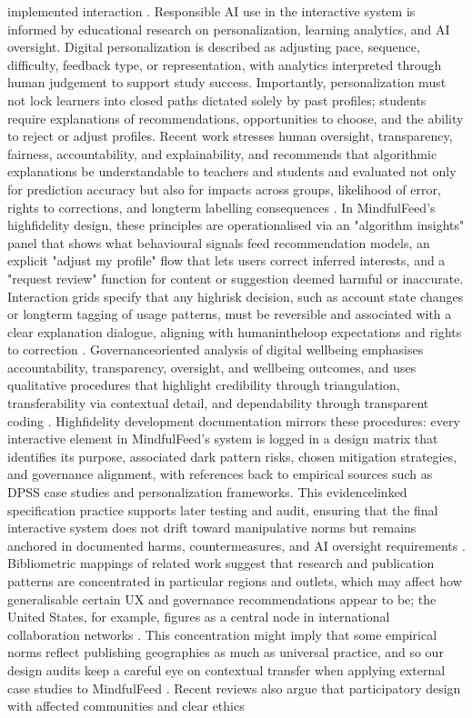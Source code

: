\documentclass{article}
\begin{document}
implemented interaction \parencites[6]{0270098}. Responsible AI use in the interactive system is informed by educational research on personalization, learning analytics, and AI oversight. Digital personalization is described as adjusting pace, sequence, difficulty, feedback type, or representation, with analytics interpreted through human judgement to support study success. Importantly, personalization must not lock learners into closed paths dictated solely by past profiles; students require explanations of recommendations, opportunities to choose, and the ability to reject or adjust profiles. Recent work stresses human oversight, transparency, fairness, accountability, and explainability, and recommends that algorithmic explanations be understandable to teachers and students and evaluated not only for prediction accuracy but also for impacts across groups, likelihood of error, rights to corrections, and long\-term labelling consequences \parencites[6]{5375614}. In MindfulFeed's high\-fidelity design, these principles are operationalised via an "algorithm insights" panel that shows what behavioural signals feed recommendation models, an explicit "adjust my profile" flow that lets users correct inferred interests, and a "request review" function for content or suggestion deemed harmful or inaccurate. Interaction grids specify that any high\-risk decision, such as account state changes or long\-term tagging of usage patterns, must be reversible and associated with a clear explanation dialogue, aligning with human\-in\-the\-loop expectations and rights to correction \parencites[6]{5375614}[11]{5375614}. Governance\-oriented analysis of digital well\-being emphasises accountability, transparency, oversight, and well\-being outcomes, and uses qualitative procedures that highlight credibility through triangulation, transferability via contextual detail, and dependability through transparent coding \parencites[8]{7808872}. High\-fidelity development documentation mirrors these procedures: every interactive element in MindfulFeed's system is logged in a design matrix that identifies its purpose, associated dark pattern risks, chosen mitigation strategies, and governance alignment, with references back to empirical sources such as DPSS case studies and personalization frameworks. This evidence\-linked specification practice supports later testing and audit, ensuring that the final interactive system does not drift toward manipulative norms but remains anchored in documented harms, countermeasures, and AI oversight requirements \parencites[7]{4807303}[6]{0270098}[6]{5375614}[8]{7808872}. Bibliometric mappings of related work suggest that research and publication patterns are concentrated in particular regions and outlets, which may affect how generalisable certain UX and governance recommendations appear to be; the United States, for example, figures as a central node in international collaboration networks \parencites[11]{9842280}. This concentration might imply that some empirical norms reflect publishing geographies as much as universal practice, and so our design audits keep a careful eye on contextual transfer when applying external case studies to MindfulFeed \parencites[11]{9842280}. Recent reviews also argue that participatory design with affected communities and clear ethics 
\end{document}
